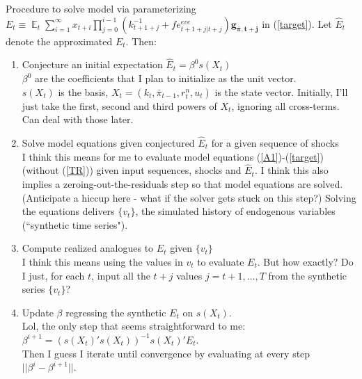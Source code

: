 \documentclass[11pt]{article}
\def \myFigPath {../../figures/}
\renewcommand{\[}{\begin{equation}}
\renewcommand{\]}{\end{equation}}
\DeclareMathOperator{\E}{\mathbb{E}}
\def\myAdjustableFigScale{0.17}
\begin{document}
Procedure to solve model via parameterizing $E_t \equiv \E_t\sum_{i=1}^{\infty}x_{t+i}\prod_{j=0}^{i-1}(k_{t+1+j}^{-1} + fe^{eve}_{t+1+j|t+j})\mathbf{g_{\bar{\pi},t+j}}$ in (\ref{target}). Let $\hat{E}_t$ denote the approximated $E_t$. Then:
\begin{enumerate}
\item Conjecture an initial expectation $\hat{E}_t=\beta^0 s(X_t)$ \\
$\beta^0$ are the coefficients that I plan to initialize as the unit vector. \\
$s(X_t)$ is the basis, $X_t = (k_t,\bar{\pi}_{t-1}, r^n_t, u_t)$ is the state vector. Initially, I'll just take the first, second and third powers of $X_t$, ignoring all cross-terms. Can deal with those later.
\item Solve model equations given conjectured $\hat{E}_t$ for a given sequence of shocks\\
I think this means for me to evaluate model equations (\ref{A1})-(\ref{target}) (without (\ref{TR})) given input sequences, shocks and $\hat{E}_t$. I think this also implies a zeroing-out-the-residuals step so that model equations are solved. (Anticipate a hiccup here - what if the solver gets stuck on this step?) Solving the equations delivers $\{v_t\}$, the simulated history of endogenous variables (``synthetic time series"). 
\item Compute realized analogues to $E_t$ given $\{v_t\}$\\
I think this means using the values in $v_t$ to evaluate $E_t$. But how exactly? Do I just, for each $t$, input all the $t+j$ values $j=t+1,\dots,T$ from the synthetic series $\{v_t\}$?
\item Update $\beta$ regressing the synthetic $E_t$ on $s(X_t)$.\\
Lol, the only step that seems straightforward to me: $\beta^{i+1} = (s(X_t)'s(X_t))^{-1}s(X_t)'E_t$.\\
Then I guess I iterate until convergence by evaluating at every step $||\beta^i-\beta^{i+1}||$.
\end{enumerate}

\begin{figure}[h!]
\hfill %
\hfill %
\caption{}
\end{figure}
\end{document}
